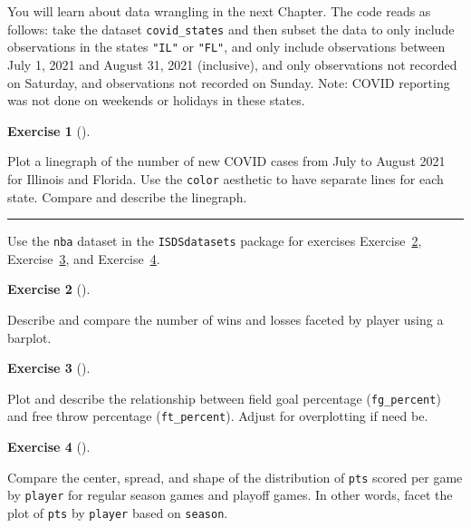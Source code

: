 \documentclass[
  letterpaper,
  DIV=11,
  numbers=noendperiod]{scrreprt}
\theoremstyle{definition}
\newtheorem{exercise}{Exercise}[chapter]
\theoremstyle{remark}
\begin{document}
You will learn about data wrangling in the next Chapter. The code reads
as follows: take the dataset \texttt{covid\_states} and then subset the
data to only include observations in the states \texttt{"IL"} or
\texttt{"FL"}, and only include observations between July 1, 2021 and
August 31, 2021 (inclusive), and only observations not recorded on
Saturday, and observations not recorded on Sunday. Note: COVID reporting
was not done on weekends or holidays in these states.

\leavevmode{}%
\begin{exercise}[]\label{exr-ch02-app1}

Plot a linegraph of the number of new COVID cases from July to August
2021 for Illinois and Florida. Use the \texttt{color} aesthetic to have
separate lines for each state. Compare and describe the linegraph.

\end{exercise}

\begin{center}\rule{0.5\linewidth}{0.5pt}\end{center}

Use the \texttt{nba} dataset in the \texttt{ISDSdatasets} package for
exercises Exercise~\ref{exr-ch02-app2}, Exercise~\ref{exr-ch02-app3},
and Exercise~\ref{exr-ch02-app4}.

\leavevmode{}%
\begin{exercise}[]\label{exr-ch02-app2}

Describe and compare the number of wins and losses faceted by player
using a barplot.

\end{exercise}

\leavevmode{}%
\begin{exercise}[]\label{exr-ch02-app3}

Plot and describe the relationship between field goal percentage
(\texttt{fg\_percent}) and free throw percentage (\texttt{ft\_percent}).
Adjust for overplotting if need be.

\end{exercise}

\leavevmode{}%
\begin{exercise}[]\label{exr-ch02-app4}

Compare the center, spread, and shape of the distribution of
\texttt{pts} scored per game by \texttt{player} for regular season games
and playoff games. In other words, facet the plot of \texttt{pts} by
\texttt{player} based on \texttt{season}.

\end{exercise}
\end{document}
